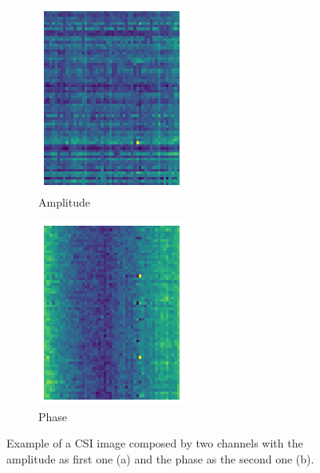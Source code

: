 \documentclass[binding=0.6cm,noexaminfo]{sapthesis}
\begin{document}
\begin{figure}[h!]
\centering
\begin{subfigure}{.49\textwidth}
	\centering
	\includegraphics[width=.6\linewidth]{results/amplitude-1}
	\caption{Amplitude}
\end{subfigure}
\begin{subfigure}{.49\textwidth}
	\centering
	\includegraphics[width=.6\linewidth]{results/phase-1}
	\caption{Phase}
\end{subfigure}
\caption{Example of a CSI image composed by two channels with the amplitude as first one (a) and the phase as the second one (b).}
\label{fig:amp-phase-image}
\end{figure}
\end{document}
